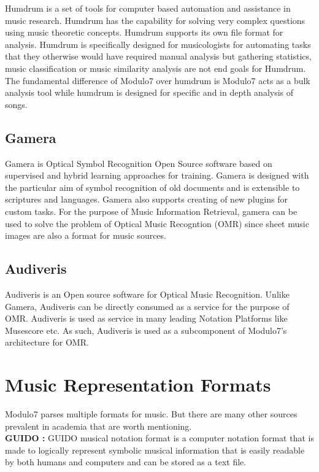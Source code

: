 \noindent Humdrum \cite{humdrum} is a set of tools for computer based automation and assistance in music research. Humdrum has the capability for solving very complex questions using music theoretic concepts. Humdrum supports its own file format for analysis. Humdrum is specifically designed for musicologists for automating tasks that they otherwise would have required manual analysis but gathering statistics, music classification or music similarity analysis are not end goals for Humdrum. The fundamental difference of Modulo7 over humdrum is Modulo7 acts as a bulk analysis tool while humdrum is designed for specific and in depth analysis of songs.


\subsection{Gamera}

\noindent Gamera \cite{gamera} is Optical Symbol Recognition Open Source software based on supervised and hybrid learning approaches for training. Gamera is designed with the particular aim of symbol recognition of old documents and is extensible to scriptures and languages. Gamera also supports creating of new plugins for custom tasks. For the purpose of Music Information Retrieval, gamera can be used to solve the problem of Optical Music Recogntion (OMR) since sheet music images are also a format for music sources.

\subsection{Audiveris}

\noindent Audiveris \cite{audiverishandbook} is an Open source software for Optical Music Recognition. Unlike Gamera, Audiveris can be directly consumed as a service for the purpose of OMR.  Audiveris is used as service in many leading Notation Platforms like Musescore etc. As such, Audiveris is used as a subcomponent of Modulo7's architecture for OMR. 

\section{Music Representation Formats}

\noindent Modulo7 parses multiple formats for music. But there are many other sources prevalent in academia that are worth mentioning. \\

\noindent \textbf{GUIDO :} GUIDO musical notation format is a computer notation format that is made to logically represent symbolic musical information that is easily readable by both humans and computers and can be stored as a text file. \\

